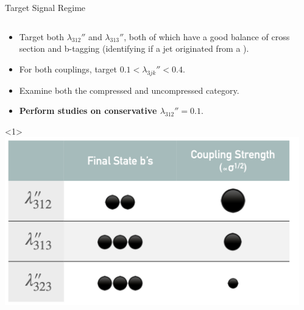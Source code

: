 \documentclass[]{beamer}
\begin{document}
\begin{frame}{Target Signal Regime}
  \begin{columns}
    \begin{column}{0.5\textwidth}
      \begin{itemize}
      \item Target both $\lambda_{312}''$ and $\lambda_{313}''$, both of which have a good balance of cross section and b-tagging (identifying if a jet originated from a \quarkb).
      \item<only@2> For both couplings, target $0.1 < \lambda_{3jk} '' < 0.4$.
      \item<only@2> Examine both the compressed and uncompressed category.
      \item<only@2> \textbf{Perform studies on conservative $\lambda_{312}'' = 0.1$}.
      \end{itemize}

      \begin{onlyenv}<1>
        \vspace{1cm}
        \includegraphics[width=1\textwidth]{figures/btable.png}
      \end{onlyenv}
    \end{column}
    \begin{column}{0.4\textwidth}
      \begin{center}
        \scalebox{0.5}{
          \begin{tikzpicture}
            \drawdiagram{\quarks /\quarkb}{\quarkd}
          \end{tikzpicture}
        }


\end{center}
\end{column}
\end{columns}
\end{frame}
\end{document}
